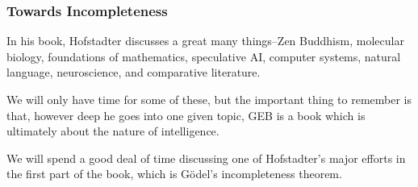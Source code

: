 \documentclass[aspectratio=169]{beamer}
\begin{document}
\begin{frame}[fragile]
  \frametitle{Towards Incompleteness}

  In his book, Hofstadter discusses a great many things--Zen Buddhism,
  molecular biology, foundations of mathematics, speculative AI,
  computer systems, natural language, neuroscience, and comparative
  literature.

  \pause
  \vspace{\fill}

  We will only have time for some of these, but the important thing
  to remember is that, however deep he goes into one given topic, GEB
  is a book which is ultimately about the nature of intelligence.

  \pause
  \vspace{\fill}

  We will spend a good deal of time discussing one of Hofstadter's major
  efforts in the first part of the book, which is G\"odel's incompleteness
  theorem.
\end{frame}




%

\end{document}
